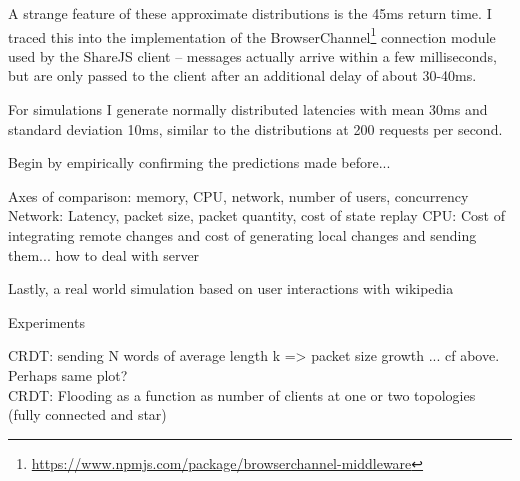 \documentclass[12pt,a4paper,twoside,openright]{report}
\begin{document}
			A strange feature of these approximate distributions is the 45ms return time. I traced this into the implementation of the BrowserChannel\footnote{\url{https://www.npmjs.com/package/browserchannel-middleware}} connection module used by the ShareJS client -- messages actually arrive within a few milliseconds, but are only passed to the client after an additional delay of about 30-40ms.
			
			For simulations I generate normally distributed latencies with mean 30ms and standard deviation 10ms, similar to the distributions at 200 requests per second.
	
		
	
	
		Begin by empirically confirming the predictions made before... 
		
		Axes of comparison: memory, CPU, network, number of users, concurrency
			Network: Latency, packet size, packet quantity, cost of state replay
			CPU: Cost of integrating remote changes and cost of generating local changes and sending them... how to deal with server
			
		
		
		Lastly, a real world simulation based on user interactions with wikipedia
		
		
		Experiments
						
			

			CRDT:	 sending N words of average length k => packet size growth ... cf above. Perhaps same plot?\\
			CRDT: 	 Flooding as a function as number of clients at one or two topologies (fully connected and star)\\
			
\end{document}
